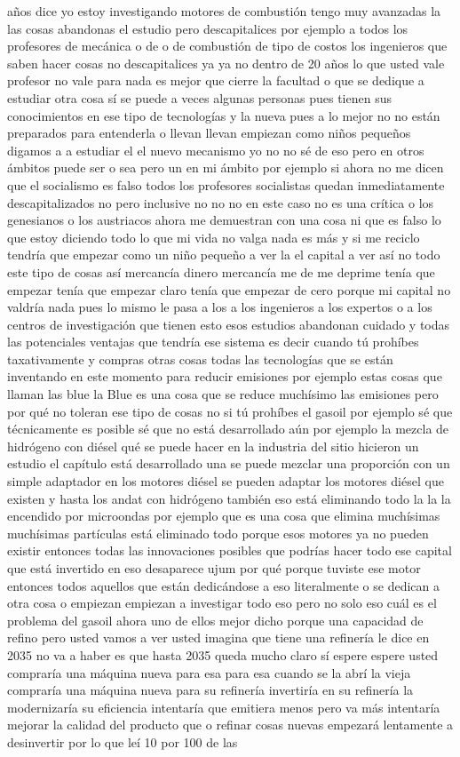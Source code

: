 años dice yo estoy investigando motores de combustión tengo muy avanzadas la las cosas abandonas el estudio pero descapitalices por ejemplo a todos los profesores de mecánica o de o de combustión de tipo de costos los ingenieros que saben hacer cosas no descapitalices ya ya no dentro de 20 años lo que usted vale profesor no vale para nada es mejor que cierre la facultad o que se dedique a estudiar otra cosa sí se puede a veces algunas personas pues tienen sus conocimientos en ese tipo de tecnologías y la nueva pues a lo mejor no no están preparados para entenderla o llevan llevan empiezan como niños pequeños digamos a a estudiar el el nuevo mecanismo yo no no sé de eso pero en otros ámbitos puede ser o sea pero un en mi ámbito por ejemplo si ahora no me dicen que el socialismo es falso todos los profesores socialistas quedan inmediatamente descapitalizados no pero inclusive no no no en este caso no es una crítica o los genesianos o los austriacos ahora me demuestran con una cosa ni que es falso lo que estoy diciendo todo lo que mi vida no valga nada es más y si me reciclo tendría que empezar como un niño pequeño a ver la el capital a ver así no todo este tipo de cosas así mercancía dinero mercancía me de me deprime tenía que empezar tenía que empezar claro tenía que empezar de cero porque mi capital no valdría nada pues lo mismo le pasa a los a los ingenieros a los expertos o a los centros de investigación que tienen esto esos estudios abandonan cuidado y todas las potenciales ventajas que tendría ese sistema es decir cuando tú prohíbes taxativamente y compras otras cosas todas las tecnologías que se están inventando en este momento para reducir emisiones por ejemplo estas cosas que llaman las blue la Blue es una cosa que se reduce muchísimo las emisiones pero por qué no toleran ese tipo de cosas no si tú prohíbes el gasoil por ejemplo sé que técnicamente es posible sé que no está desarrollado aún por ejemplo la mezcla de hidrógeno con diésel qué se puede hacer en la industria del sitio hicieron un estudio el capítulo está desarrollado una se puede mezclar una proporción con un simple adaptador en los motores diésel se pueden adaptar los motores diésel que existen y hasta los andat con hidrógeno también eso está eliminando todo la la la encendido por microondas por ejemplo que es una cosa que elimina muchísimas muchísimas partículas está eliminado todo porque esos motores ya no pueden existir entonces todas las innovaciones posibles que podrías hacer todo ese capital que está invertido en eso desaparece ujum por qué porque tuviste ese motor entonces todos aquellos que están dedicándose a eso literalmente o se dedican a otra cosa o empiezan empiezan a investigar todo eso pero no solo eso cuál es el problema del gasoil ahora uno de ellos mejor dicho porque una capacidad de refino pero usted vamos a ver usted imagina que tiene una refinería le dice en 2035 no va a haber es que hasta 2035 queda mucho claro sí espere espere usted compraría una máquina nueva para esa para esa cuando se la abrí la vieja compraría una máquina nueva para su refinería invertiría en su refinería la modernizaría su eficiencia intentaría que emitiera menos pero va más intentaría mejorar la calidad del producto que o refinar cosas nuevas empezará lentamente a desinvertir por lo que leí 10 por 100 de las 